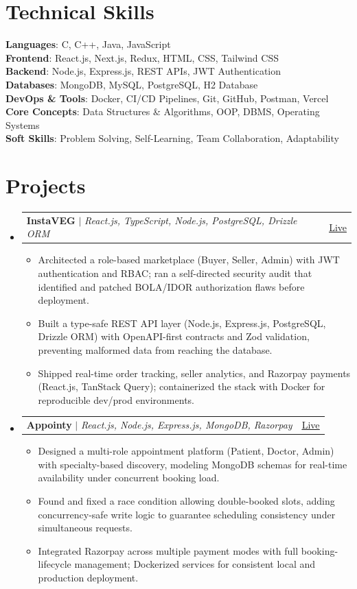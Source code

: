 \documentclass[letterpaper,11pt]{article}
\makeatletter
\newcommand{\resumeItem}[1]{
  \item\small{
    {#1 \vspace{-4pt}}
  }
}
\newcommand{\resumeProjectHeading}[2]{
    \item
    \begin{tabular*}{0.97\textwidth}{l@{\extracolsep{\fill}}r}
      \small#1 & #2 \\
    \end{tabular*}\vspace{-9pt}
}
\newcommand{\resumeSubHeadingListStart}{\begin{itemize}[leftmargin=0.15in, label={}]}
\newcommand{\resumeSubHeadingListEnd}{\end{itemize}}
\newcommand{\resumeItemListStart}{\begin{itemize}[label=$\vcenter{\hbox{\tiny$\bullet$}}$]}
\newcommand{\resumeItemListEnd}{\end{itemize}\vspace{-7pt}}
\makeatother
\begin{document}
  \section{Technical Skills}
 \begin{itemize}[leftmargin=0.15in, label={}]
    \small{\item{
     \textbf{Languages}{: C, C++, Java, JavaScript} \\
     \textbf{Frontend}{: React.js, Next.js, Redux, HTML, CSS, Tailwind CSS} \\
     \textbf{Backend}{: Node.js, Express.js, REST APIs, JWT Authentication} \\
     \textbf{Databases}{: MongoDB, MySQL, PostgreSQL, H2 Database} \\
     \textbf{DevOps \& Tools}{: Docker, CI/CD Pipelines, Git, GitHub, Postman, Vercel} \\
     \textbf{Core Concepts}{: Data Structures \& Algorithms, OOP, DBMS, Operating Systems} \\
     \textbf{Soft Skills}{: Problem Solving, Self-Learning, Team Collaboration, Adaptability} \\
    }}
 \end{itemize}


\section{Projects}
\resumeSubHeadingListStart
\resumeProjectHeading
{\textbf{InstaVEG} $|$ \emph{React.js, TypeScript, Node.js, PostgreSQL, Drizzle ORM}}{\href{https://green-mart-connect--mnvj69.replit.app/}{\underline{Live}}}
\resumeItemListStart
\resumeItem{Architected a role-based marketplace (Buyer, Seller, Admin) with JWT authentication and RBAC; ran a self-directed security audit that identified and patched BOLA/IDOR authorization flaws before deployment.}
\resumeItem{Built a type-safe REST API layer (Node.js, Express.js, PostgreSQL, Drizzle ORM) with OpenAPI-first contracts and Zod validation, preventing malformed data from reaching the database.}
\resumeItem{Shipped real-time order tracking, seller analytics, and Razorpay payments (React.js, TanStack Query); containerized the stack with Docker for reproducible dev/prod environments.}
\resumeItemListEnd

\resumeProjectHeading
{\textbf{Appointy} $|$ \emph{React.js, Node.js, Express.js, MongoDB, Razorpay}}{\href{https://appointy-roan.vercel.app/}{\underline{Live}}}
\resumeItemListStart
\resumeItem{Designed a multi-role appointment platform (Patient, Doctor, Admin) with specialty-based discovery, modeling MongoDB schemas for real-time availability under concurrent booking load.}
\resumeItem{Found and fixed a race condition allowing double-booked slots, adding concurrency-safe write logic to guarantee scheduling consistency under simultaneous requests.}
\resumeItem{Integrated Razorpay across multiple payment modes with full booking-lifecycle management; Dockerized services for consistent local and production deployment.}
\resumeItemListEnd
\resumeSubHeadingListEnd
\end{document}
